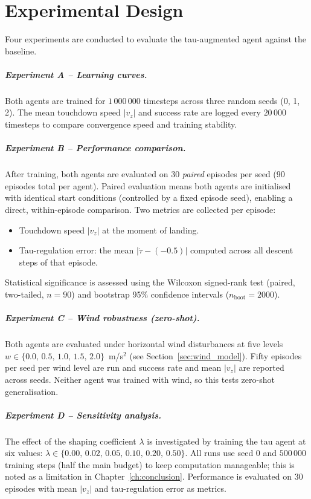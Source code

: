\chapter{Experimental Design}
\label{ch:experiments}

Four experiments are conducted to evaluate the tau-augmented agent against the baseline.

\paragraph{Experiment A -- Learning curves.}
Both agents are trained for $1\,000\,000$ timesteps across three random seeds (0, 1, 2).
The mean touchdown speed $|v_z|$ and success rate are logged every $20\,000$ timesteps
to compare convergence speed and training stability.

\paragraph{Experiment B -- Performance comparison.}
After training, both agents are evaluated on 30 \emph{paired} episodes per seed
(90 episodes total per agent).
Paired evaluation means both agents are initialised with identical start conditions
(controlled by a fixed episode seed), enabling a direct, within-episode comparison.
Two metrics are collected per episode:
\begin{itemize}
  \item Touchdown speed $|v_z|$ at the moment of landing.
  \item Tau-regulation error: the mean $|\dot{\tau} - (-0.5)|$ computed across all
        descent steps of that episode.
\end{itemize}
Statistical significance is assessed using the Wilcoxon signed-rank test (paired,
two-tailed, $n = 90$) and bootstrap 95\% confidence intervals
($n_\text{boot} = 2000$).

\paragraph{Experiment C -- Wind robustness (zero-shot).}
Both agents are evaluated under horizontal wind disturbances at five levels
$w \in \{0.0,\, 0.5,\, 1.0,\, 1.5,\, 2.0\}$~m/s$^2$ (see Section~\ref{sec:wind_model}).
Fifty episodes per seed per wind level are run and success rate and mean $|v_z|$ are
reported across seeds.
Neither agent was trained with wind, so this tests zero-shot generalisation.

\paragraph{Experiment D -- Sensitivity analysis.}
The effect of the shaping coefficient $\lambda$ is investigated by training the tau
agent at six values:
$\lambda \in \{0.00,\, 0.02,\, 0.05,\, 0.10,\, 0.20,\, 0.50\}$.
All runs use seed 0 and $500\,000$ training steps (half the main budget) to keep
computation manageable; this is noted as a limitation in
Chapter~\ref{ch:conclusion}.
Performance is evaluated on 30 episodes with mean $|v_z|$ and tau-regulation error
as metrics.
